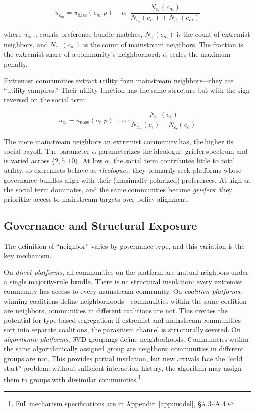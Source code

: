 \documentclass{article}
\begin{document}
\begin{equation}
u_{c_m} = u_{\text{base}}(c_m, p) - \alpha \cdot \frac{N_{c_e}(c_m)}{N_{c_e}(c_m) + N_{c_m}(c_m)}
\label{eq:mainstream}
\end{equation}

\noindent where $u_{\text{base}}$ counts preference-bundle matches, $N_{c_e}(c_m)$ is the count of extremist neighbors, and $N_{c_m}(c_m)$ is the count of mainstream neighbors. The fraction is the extremist share of a community's neighborhood; $\alpha$ scales the maximum penalty.

Extremist communities extract utility from mainstream neighbors---they are ``utility vampires.'' Their utility function has the same structure but with the sign reversed on the social term:

\begin{equation}
u_{c_e} = u_{\text{base}}(c_e, p) + \alpha \cdot \frac{N_{c_m}(c_e)}{N_{c_m}(c_e) + N_{c_e}(c_e)}
\label{eq:griefer}
\end{equation}

\noindent The more mainstream neighbors an extremist community has, the higher its social payoff. The parameter $\alpha$ parameterizes the ideologue--griefer spectrum and is varied across $\{2, 5, 10\}$. At low $\alpha$, the social term contributes little to total utility, so extremists behave as \textit{ideologues}: they primarily seek platforms whose governance bundles align with their (maximally polarized) preferences. At high $\alpha$, the social term dominates, and the same communities become \textit{griefers}: they prioritize access to mainstream targets over policy alignment.

\subsection{Governance and Structural Exposure}

The definition of ``neighbor'' varies by governance type, and this variation is the key mechanism.

On \textit{direct platforms}, all communities on the platform are mutual neighbors under a single majority-rule bundle. There is no structural insulation: every extremist community has access to every mainstream community. On \textit{coalition platforms}, winning coalitions define neighborhoods---communities within the same coalition are neighbors, communities in different coalitions are not. This creates the potential for type-based segregation: if extremist and mainstream communities sort into separate coalitions, the parasitism channel is structurally severed. On \textit{algorithmic platforms}, SVD groupings define neighborhoods. Communities within the same algorithmically assigned group are neighbors; communities in different groups are not. This provides partial insulation, but new arrivals face the ``cold start'' problem: without sufficient interaction history, the algorithm may assign them to groups with dissimilar communities.\footnote{Full mechanism specifications are in Appendix~\ref{app:model}, \S A.3--A.4.}
\end{document}

